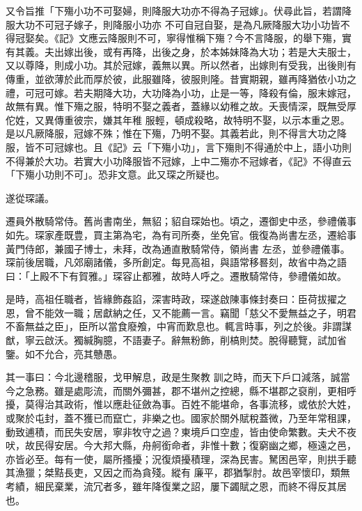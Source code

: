 \begin{pinyinscope}
 又令旨推「下殤小功不可娶婦，則降服大功亦不得為子冠嫁」。伏尋此旨，若謂降服大功不可冠子嫁子，則降服小功亦
 不可自冠自娶，是為凡厥降服大功小功皆不得冠娶矣。《記》文應云降服則不可，寧得惟稱下殤？今不言降服，的舉下殤，實有其義。夫出嫁出後，或有再降，出後之身，於本姊妹降為大功；若是大夫服士，又以尊降，則成小功。其於冠嫁，義無以異。所以然者，出嫁則有受我，出後則有傳重，並欲薄於此而厚於彼，此服雖降，彼服則隆。昔實期親，雖再降猶依小功之禮，可冠可嫁。若夫期降大功，大功降為小功，止是一等，降殺有倫，服末嫁冠，故無有異。惟下殤之服，特明不娶之義者，蓋緣以幼稚之故。夭喪情深，既無受厚佗姓，又異傳重彼宗，嫌其年稚
 服輕，頓成殺略，故特明不娶，以示本重之恩。是以凡厥降服，冠嫁不殊；惟在下殤，乃明不娶。其義若此，則不得言大功之降服，皆不可冠嫁也。且《記》云「下殤小功」，言下殤則不得通於中上，語小功則不得兼於大功。若實大小功降服皆不冠嫁，上中二殤亦不冠嫁者，《記》不得直云「下殤小功則不可」。恐非文意。此又琛之所疑也。



 遂從琛議。



 遷員外散騎常侍。舊尚書南坐，無貂；貂自琛始也。頃之，遷御史中丞，參禮儀事如先。琛家產既豊，買主第為宅，為有司所奏，坐免官。俄復為尚書左丞，遷給事黃門侍郎，兼國子博士，未拜，改為通直散騎常侍，領尚書
 左丞，並參禮儀事。琛前後居職，凡郊廟諸儀，多所創定。每見高祖，與語常移晷刻，故省中為之語曰：「上殿不下有賀雅。」琛容止都雅，故時人呼之。遷散騎常侍，參禮儀如故。



 是時，高祖任職者，皆緣飾姦諂，深害時政，琛遂啟陳事條封奏曰：臣荷拔擢之恩，曾不能效一職；居獻納之任，又不能薦一言。竊聞「慈父不愛無益之子，明君不畜無益之臣」，臣所以當食廢飧，中宵而歎息也。輒言時事，列之於後。非謂謀猷，寧云啟沃。獨緘胸臆，不語妻子。辭無粉飾，削槁則焚。脫得聽覽，試加省鑒。如不允合，亮其戇愚。



 其一事曰：今北邊稽服，戈甲解息，政是生聚教
 訓之時，而天下戶口減落，誠當今之急務。雖是處彫流，而關外彌甚，郡不堪州之控總，縣不堪郡之裒削，更相呼擾，莫得治其政術，惟以應赴征斂為事。百姓不能堪命，各事流移，或依於大姓，或聚於屯封，蓋不獲已而竄亡，非樂之也。國家於關外賦稅蓋微，乃至年常租課，動致逋積，而民失安居，寧非牧守之過？東境戶口空虛，皆由使命繁數。夫犬不夜吠，故民得安居。今大邦大縣，舟舸銜命者，非惟十數；復窮幽之鄉，極遠之邑，亦皆必至。每有一使，屬所搔擾；況復煩擾積理，深為民害。駑困邑宰，則拱手聽其漁獵；桀黠長吏，又因之而為貪殘。縱有
 廉平，郡猶掣肘。故邑宰懷印，類無考績，細民棄業，流冗者多，雖年降復業之詔，屢下蠲賦之恩，而終不得反其居也。




\end{pinyinscope}
